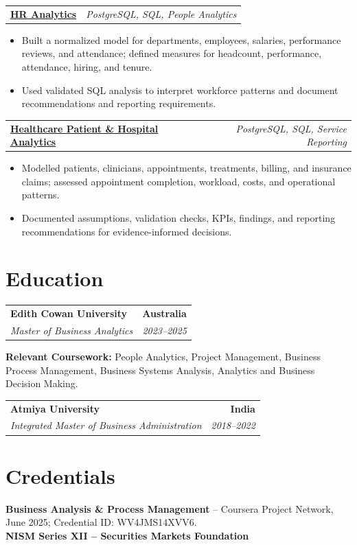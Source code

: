 \documentclass[letterpaper,10pt]{article}
\makeatletter
\newcommand{\role}[4]{%
  \begin{tabularx}{\textwidth}{@{}Xr@{}}
    \textbf{#1} & \textbf{#2} \\
    \textit{#3} & \textit{#4}
  \end{tabularx}\vspace{-1pt}
}
\newcommand{\project}[2]{%
  \begin{tabularx}{\textwidth}{@{}Xr@{}}
    \textbf{#1} & \textit{#2}
  \end{tabularx}\vspace{-1pt}
}
\makeatother
\begin{document}
\project{\href{https://github.com/jainalimehta/HR-Analytics}{HR Analytics}}{PostgreSQL, SQL, People Analytics}
\begin{itemize}
  \item Built a normalized model for departments, employees, salaries, performance reviews, and attendance; defined measures for headcount, performance, attendance, hiring, and tenure.
  \item Used validated SQL analysis to interpret workforce patterns and document recommendations and reporting requirements.
\end{itemize}
\vspace{1pt}

\project{\href{https://github.com/jainalimehta/Healthcare-Analytics}{Healthcare Patient \& Hospital Analytics}}{PostgreSQL, SQL, Service Reporting}
\begin{itemize}
  \item Modelled patients, clinicians, appointments, treatments, billing, and insurance claims; assessed appointment completion, workload, costs, and operational patterns.
  \item Documented assumptions, validation checks, KPIs, findings, and reporting recommendations for evidence-informed decisions.
\end{itemize}

\section{Education}
\role{Edith Cowan University}{Australia}{Master of Business Analytics}{2023--2025}
\small\textbf{Relevant Coursework:} People Analytics, Project Management, Business Process Management, Business Systems Analysis, Analytics and Business Decision Making.\\[2pt]
\role{Atmiya University}{India}{Integrated Master of Business Administration}{2018--2022}

\section{Credentials}
\small\textbf{Business Analysis \& Process Management} -- Coursera Project Network, June 2025; Credential ID: WV4JMS14XVV6.\\[-0.2pt]
\small\textbf{NISM Series XII -- Securities Markets Foundation}
\end{document}
